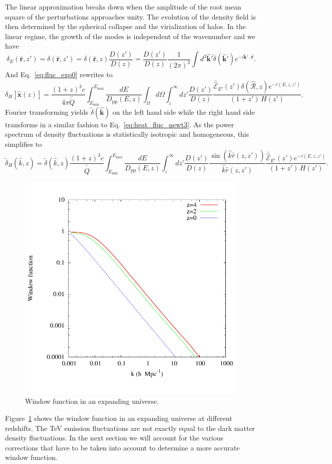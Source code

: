 \documentclass[numberedappendix]{emulateapj}
\begin{document}
The linear approximation breaks down when the amplitude of the root mean square of the perturbations approaches unity. The evolution of the density field is then determined by the spherical collapse \citep{1972ApJ...176....1G} and the virialization of halos. In the linear regime, the growth of the modes is independent of the wavenumber and we have
\begin{equation}
\label{eq:FT_delta}
\delta_E(\mathbf{\hat{r}}, z')=\delta(\mathbf{\hat{r}}, z')
=\delta(\mathbf{\hat{r}}, z)\frac{D(z')}{D(z)}
=\frac{D(z')}{D(z)}\frac{1}{(2\pi)^3}\int d^3\mathbf{\hat k'} \tilde{\delta}(\mathbf{\hat k'}) e^{-i\mathbf{\hat k'}\cdot\mathbf{\hat r}}.
\end{equation}
And Eq.~\eqref{eq:fluc_exp0} rewrites to
\begin{equation}
\label{eq:heat_fluc_exp0}
\delta_H[\mathbf{\hat{x}}(z)]=\frac{(1+z)^3  c}{4\pi\bar{\dot{Q}}}\int_{E_{\mathrm{min}}}^{E_{\mathrm{max}}} \frac{dE}{D_{\mathrm{pp}}(E,z)} \int_{\Omega}d\Omega\int_z^{\infty}dz' \frac{D(z')}{D(z)} \frac{\bar{\hat{\mathcal{E}}}_{E'}(z')\delta(\mathbf{\hat{\mathcal{R}}}, z) e^{-\tau(E,z,z')}}{(1+z')\,H(z')}.
\end{equation}
Fourier transforming yields $\tilde{\delta}(\mathbf{\hat k})$ on the left hand side while the right hand side transforms in a similar fashion to Eq.~\eqref{eq:heat_fluc_newt3}. As the power spectrum of density fluctuations is statistically isotropic and homogeneous, this simplifies to
\begin{equation}
\label{eq:heat_fluc_exp1}
\tilde{\delta}_H(\hat k, z)=\tilde{\delta}(\hat k, z) \frac{(1+z)^3c}{\bar{\dot{Q}}} \int_{E_{\mathrm{min}}}^{E_{\mathrm{max}}} \frac{dE}{D_{\mathrm{pp}}(E,z)}\int_z^{\infty} dz' \frac{D(z')}{D(z)}\frac{\sin\left(\hat k\hat r(z,z')\right)}{\hat k \hat r(z, z')} \frac{\bar{\hat{\mathcal{E}}}_{E'}(z') e^{-\tau(E,z,z')}} {(1+z')\,H(z')}.
\end{equation}
\begin{figure}[h]
\centering
\includegraphics[width = .45\textwidth ]{window_nobiases-eps-converted-to}
\caption{Window function in an expanding universe.}
\label{fig:window_nobiases}
\end{figure}
Figure~\ref{fig:window_nobiases} shows the window function in an expanding universe at different redshifts. %
The TeV emission fluctuations are not exactly equal to the dark matter density fluctuations. In the next section we will account for the various corrections that have to be taken into account to determine a more accurate window function.
\end{document}
